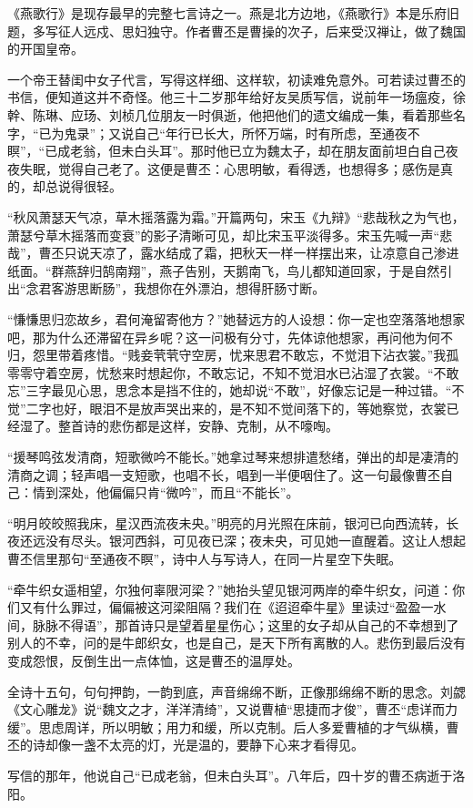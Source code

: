 \begin{appreciation}
《燕歌行》是现存最早的完整七言诗之一。燕是北方边地，《燕歌行》本是乐府旧题，多写征人远戍、思妇独守。作者曹丕是曹操的次子，后来受汉禅让，做了魏国的开国皇帝。

一个帝王替闺中女子代言，写得这样细、这样软，初读难免意外。可若读过曹丕的书信，便知道这并不奇怪。他三十二岁那年给好友吴质写信，说前年一场瘟疫，徐幹、陈琳、应玚、刘桢几位朋友一时俱逝，他把他们的遗文编成一集，看着那些名字，“已为鬼录”；又说自己“年行已长大，所怀万端，时有所虑，至通夜不瞑”，“已成老翁，但未白头耳”。那时他已立为魏太子，却在朋友面前坦白自己夜夜失眠，觉得自己老了。这便是曹丕：心思明敏，看得透，也想得多；感伤是真的，却总说得很轻。

“秋风萧瑟天气凉，草木摇落露为霜。”开篇两句，宋玉《九辩》“悲哉秋之为气也，萧瑟兮草木摇落而变衰”的影子清晰可见，却比宋玉平淡得多。宋玉先喊一声“悲哉”，曹丕只说天凉了，露水结成了霜，把秋天一样一样摆出来，让凉意自己渗进纸面。“群燕辞归鹄南翔”，燕子告别，天鹅南飞，鸟儿都知道回家，于是自然引出“念君客游思断肠”，我想你在外漂泊，想得肝肠寸断。

“慊慊思归恋故乡，君何淹留寄他方？”她替远方的人设想：你一定也空落落地想家吧，那为什么还滞留在异乡呢？这一问极有分寸，先体谅他想家，再问他为何不归，怨里带着疼惜。“贱妾茕茕守空房，忧来思君不敢忘，不觉泪下沾衣裳。”我孤零零守着空房，忧愁来时想起你，不敢忘记，不知不觉泪水已沾湿了衣裳。“不敢忘”三字最见心思，思念本是挡不住的，她却说“不敢”，好像忘记是一种过错。“不觉”二字也好，眼泪不是放声哭出来的，是不知不觉间落下的，等她察觉，衣裳已经湿了。整首诗的悲伤都是这样，安静、克制，从不嚎啕。

“援琴鸣弦发清商，短歌微吟不能长。”她拿过琴来想排遣愁绪，弹出的却是凄清的清商之调；轻声唱一支短歌，也唱不长，唱到一半便咽住了。这一句最像曹丕自己：情到深处，他偏偏只肯“微吟”，而且“不能长”。

“明月皎皎照我床，星汉西流夜未央。”明亮的月光照在床前，银河已向西流转，长夜还远没有尽头。银河西斜，可见夜已深；夜未央，可见她一直醒着。这让人想起曹丕信里那句“至通夜不瞑”，诗中人与写诗人，在同一片星空下失眠。

“牵牛织女遥相望，尔独何辜限河梁？”她抬头望见银河两岸的牵牛织女，问道：你们又有什么罪过，偏偏被这河梁阻隔？我们在《迢迢牵牛星》里读过“盈盈一水间，脉脉不得语”，那首诗只是望着星星伤心；这里的女子却从自己的不幸想到了别人的不幸，问的是牛郎织女，也是自己，是天下所有离散的人。悲伤到最后没有变成怨恨，反倒生出一点体恤，这是曹丕的温厚处。

全诗十五句，句句押韵，一韵到底，声音绵绵不断，正像那绵绵不断的思念。刘勰《文心雕龙》说“魏文之才，洋洋清绮”，又说曹植“思捷而才俊”，曹丕“虑详而力缓”。思虑周详，所以明敏；用力和缓，所以克制。后人多爱曹植的才气纵横，曹丕的诗却像一盏不太亮的灯，光是温的，要静下心来才看得见。

写信的那年，他说自己“已成老翁，但未白头耳”。八年后，四十岁的曹丕病逝于洛阳。
\end{appreciation}

